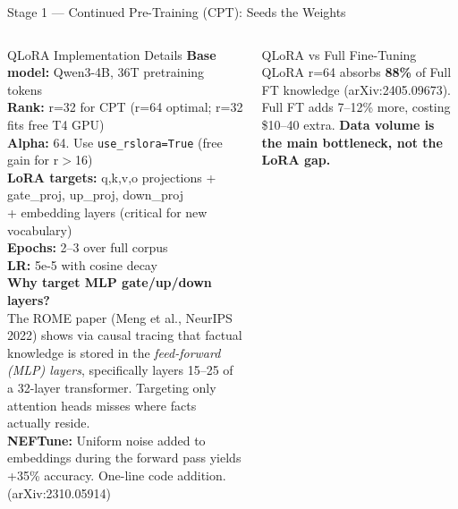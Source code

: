\documentclass[aspectratio=169,11pt]{beamer}
\begin{document}
\begin{frame}[shrink=18]{Stage 1 --- Continued Pre-Training (CPT): Seeds the Weights}
\begin{columns}[T]
\begin{block}{QLoRA Implementation Details}
  \scriptsize\RaggedRight
  \textbf{Base model:} Qwen3-4B, 36T pretraining tokens\\[2pt]
  \textbf{Rank:} r=32 for CPT (r=64 optimal; r=32 fits free T4 GPU)\\
  \textbf{Alpha:} 64.  Use \texttt{use\_rslora=True} (free gain for r$>$16)\\
  \textbf{LoRA targets:} q,k,v,o projections
    + gate\_proj, up\_proj, down\_proj\\
    + embedding layers (critical for new vocabulary)\\[3pt]
  \textbf{Epochs:} 2--3 over full corpus\\
  \textbf{LR:} 5e-5 with cosine decay\\[4pt]
  \textbf{Why target MLP gate/up/down layers?}\\
  The ROME paper (Meng et al., NeurIPS 2022) shows via causal tracing
  that factual knowledge is stored in the \emph{feed-forward (MLP) layers},
  specifically layers 15--25 of a 32-layer transformer.
  Targeting only attention heads misses where facts actually reside.\\[4pt]
  \textbf{NEFTune:} Uniform noise added to embeddings during the forward
  pass yields +35\% accuracy.  One-line code addition.  (arXiv:2310.05914)
\end{block}

\begin{block}{QLoRA vs Full Fine-Tuning}
  \scriptsize\RaggedRight
  QLoRA r=64 absorbs \textbf{88\%} of Full FT knowledge
  (arXiv:2405.09673).  Full FT adds 7--12\% more, costing \$10--40 extra.
  \textbf{Data volume is the main bottleneck, not the LoRA gap.}
\end{block}

\end{columns}
\end{frame}
\end{document}
